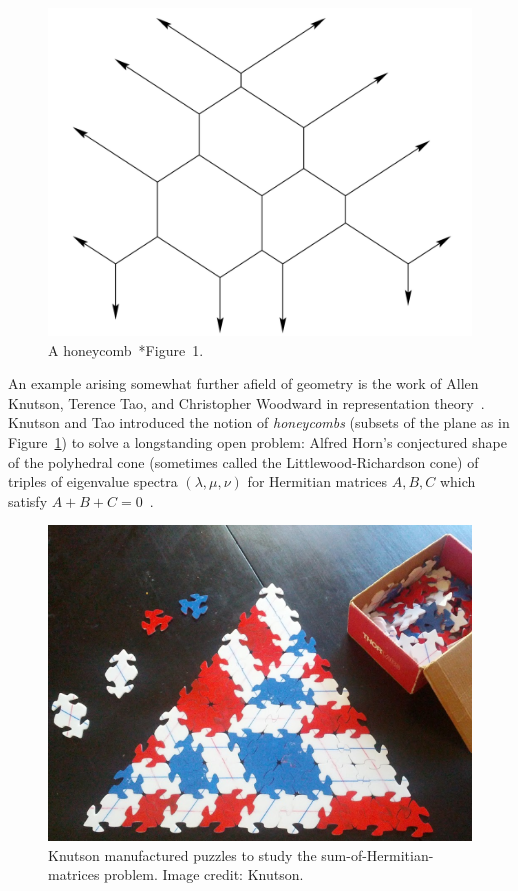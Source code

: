 \documentclass{notices}
\begin{document}
\begin{figure}
    \centering
    \includegraphics[width=1.0\linewidth]{images/honeycomb.png}
    \caption{A honeycomb~\cite{honeycombAMS}*{Figure~1}.}
    \label{Fig:hoenycomb}
\end{figure}

An example arising somewhat further afield of geometry is the work of Allen Knutson, Terence Tao, and Christopher Woodward in representation theory~\cites{honeycombAMS, honeycomb2}.
 Knutson and Tao introduced the notion of \emph{honeycombs} (subsets of the plane as in Figure~\ref{Fig:hoenycomb}) to solve a longstanding open problem: Alfred Horn's conjectured shape of the polyhedral cone (sometimes called the Littlewood-Richardson cone) of triples of eigenvalue spectra $(\lambda, \mu, \nu)$ for Hermitian matrices $A, B, C$ which satisfy $A + B+ C = 0$~\cite{horn62}.  

\begin{figure}
    \centering
    \includegraphics[width = 1.\linewidth]{images/KnutsonPuzzleCropped.png}
    \caption{Knutson manufactured puzzles to study the sum-of-Hermitian-matrices problem. Image credit: Knutson.}
    \label{Fig:puzzle}
\end{figure}
 
\end{document}
